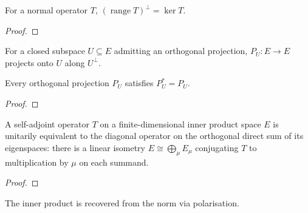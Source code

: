 \begin{theorem}[Rudin 12.26, kernel $=$ range orthogonal complement for normal operators]
  \label{thm:normal-orthogonal-range}
  \leanok
  For a normal operator $T$, $(\operatorname{range} T)^{\perp} = \ker T$.
\end{theorem}
\begin{proof}
  \leanok
\end{proof}

\begin{definition}
  \label{def:ortho-proj}
  \leanok
  For a closed subspace $U \subseteq E$ admitting an orthogonal
  projection, $P_U\colon E \to E$ projects onto $U$ along $U^{\perp}$.
\end{definition}

\begin{theorem}
  \label{thm:ortho-proj-self-adjoint}
  \leanok
  Every orthogonal projection $P_U$ satisfies $P_U^{*} = P_U$.
\end{theorem}
\begin{proof}
  \leanok
\end{proof}

\begin{theorem}
  \label{thm:spectral-diagonalization}
  \leanok
  A self-adjoint operator $T$ on a finite-dimensional inner product
  space $E$ is unitarily equivalent to the diagonal operator on the
  orthogonal direct sum of its eigenspaces: there is a linear isometry
  $E \cong \bigoplus_\mu E_\mu$ conjugating $T$ to multiplication by
  $\mu$ on each summand.
\end{theorem}
\begin{proof}
  \leanok
\end{proof}


\begin{theorem}
  \label{thm:polarisation}
  \leanok
  The inner product is recovered from the norm via polarisation.
\end{theorem}

